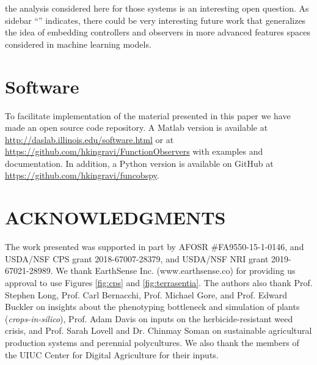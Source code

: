 \documentclass[letterpaper,12pt,peerreviewca,draftcls]{IEEEtran}
\begin{document}
the analysis considered here for those systems is an interesting open question. As sidebar ``'' indicates, there could be very interesting future work that generalizes the idea of embedding controllers and observers in more advanced features spaces considered in machine learning models. 








\section{Software}
To facilitate implementation of the material presented in this paper we have made an open source code repository. A Matlab version is available at \url{http://daslab.illinois.edu/software.html} or at \url{https://github.com/hkingravi/FunctionObservers} with examples and documentation. In addition, a Python version is available on GitHub at \url{https://github.com/hkingravi/funcobspy}.

\section{ACKNOWLEDGMENTS}
The work presented was supported in part by AFOSR \#FA9550-15-1-0146, %
and USDA/NSF CPS grant 2018-67007-28379, and USDA/NSF NRI grant 2019-67021-28989.  We thank EarthSense Inc. (www.earthsense.co) for providing us approval to use Figures \ref{fig:cps} and \ref{fig:terrasentia}. The authors also thank Prof. Stephen Long, Prof. Carl Bernacchi, Prof. Michael Gore, and Prof. Edward Buckler on insights about the phenotyping bottleneck and simulation of plants (\textit{crops-in-silico}), Prof. Adam Davis on inputs on the herbicide-resistant weed crisis, and Prof. Sarah Lovell and Dr. Chinmay Soman on sustainable agricultural production systems and perennial polycultures. We also thank the members of the UIUC Center for Digital Agriculture for their inputs.

%

\end{document}
